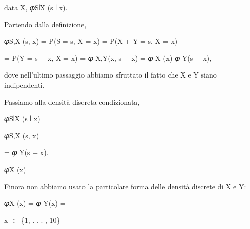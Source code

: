 \documentclass[a4paper,portrait,12pt]{article}
\begin{document}
\begin{flushleft}
data X, 𝜑S∣X (s ∣ x).
\end{flushleft}


\begin{flushleft}
Partendo dalla definizione,
\end{flushleft}


\begin{flushleft}
𝜑S,X (s, x) = P(S = s, X = x) = P(X + Y = s, X = x)
\end{flushleft}


\begin{flushleft}
= P(Y = s $-$ x, X = x) = 𝜑 X,Y(x, s $-$ x) = 𝜑 X (x) 𝜑 Y(s $-$ x),
\end{flushleft}


\begin{flushleft}
dove nell'ultimo passaggio abbiamo sfruttato il fatto che X e Y siano indipendenti.
\end{flushleft}


\begin{flushleft}
Passiamo alla densit\`{a} discreta condizionata,
\end{flushleft}


\begin{flushleft}
𝜑S∣X (s ∣ x) =
\end{flushleft}





\begin{flushleft}
𝜑S,X (s, x)
\end{flushleft}


\begin{flushleft}
= 𝜑 Y(s $-$ x).
\end{flushleft}


\begin{flushleft}
𝜑X (x)
\end{flushleft}





\begin{flushleft}
Finora non abbiamo usato la particolare forma delle densit\`{a} discrete di X e Y:
\end{flushleft}


\begin{flushleft}
𝜑X (x) = 𝜑 Y(x) =
\end{flushleft}





\begin{flushleft}
x $\in$ \{1, . . . , 10\}
\end{flushleft}
\end{document}
